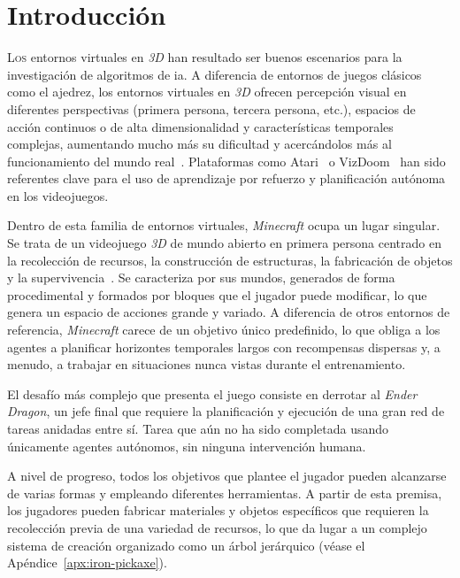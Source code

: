 \chapter{Introducción}
\label{chap:introduccion}

\lettrine{L}{os} entornos virtuales en \textit{3D} han resultado ser buenos escenarios para
la investigación de algoritmos de \gls{ia}.
A diferencia de entornos de juegos clásicos como el ajedrez, los entornos virtuales en \textit{3D} ofrecen
percepción visual en diferentes perspectivas (primera persona, tercera persona, etc.),
espacios de acción continuos o de alta dimensionalidad y características temporales complejas,
aumentando mucho más su dificultad y acercándolos más al funcionamiento del mundo
real~\cite{DBLP:journals/nature/SilverHMGSDSAPL16,DBLP:journals/nature/VinyalsBCMDCCPE19}.
Plataformas como Atari~\cite{DBLP:journals/nature/MnihKSRVBGRFOPB15} o VizDoom~\cite{kempka2016vizdoom}
han sido referentes clave para el uso de aprendizaje por refuerzo y planificación autónoma
en los videojuegos.

Dentro de esta familia de entornos virtuales, \textit{Minecraft} ocupa un lugar singular.
Se trata de un videojuego \textit{3D} de mundo abierto en primera persona
centrado en la recolección de recursos, la construcción de estructuras,
la fabricación de objetos y la supervivencia~\cite{guss2019minerl}. Se caracteriza por sus mundos, 
generados de forma procedimental y formados por bloques que el jugador
puede modificar, lo que genera un espacio de acciones grande y variado.
A diferencia de otros entornos de referencia, \textit{Minecraft} carece de un objetivo 
único predefinido, lo que obliga a los agentes a planificar
horizontes temporales largos con recompensas dispersas y, a menudo,
a trabajar en situaciones nunca vistas durante el entrenamiento.

El desafío más complejo que presenta el juego consiste en derrotar al \textit{Ender Dragon},
un jefe final que requiere la planificación y ejecución de una gran red de tareas anidadas entre sí.
Tarea que aún no ha sido completada usando únicamente agentes autónomos, sin ninguna intervención humana.

A nivel de progreso, todos los objetivos que plantee el jugador pueden alcanzarse de varias formas y empleando diferentes herramientas.
A partir de esta premisa, los jugadores pueden fabricar materiales y objetos específicos que requieren la recolección previa 
de una variedad de recursos, lo que da lugar a un complejo sistema de creación organizado como un árbol jerárquico
(véase el Apéndice~\ref{apx:iron-pickaxe}).

